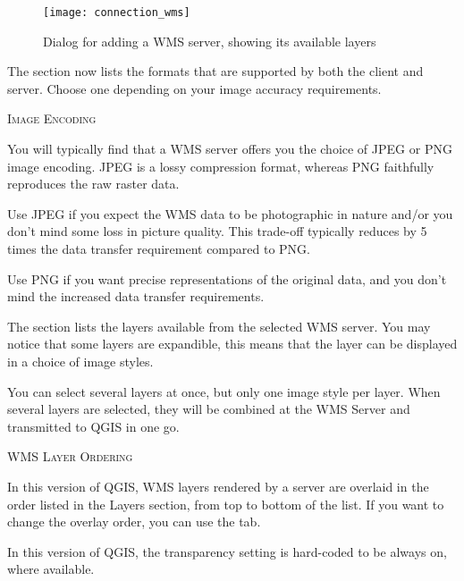 \begin{figure}[ht]
  \centering
  \texttt{[image: connection\_wms]}  
  \caption{Dialog for adding a WMS server, showing its available layers \nixcaption}\label{fig:connection_wms}
\end{figure}


The  section now lists the formats that are supported by both
the client and server.  Choose one depending on your image accuracy requirements.

\begin{Tip}[ht]\caption{\textsc{Image Encoding}}
You will typically find that a WMS server offers you the choice
of JPEG or PNG image encoding.  JPEG is a lossy compression format,
whereas PNG faithfully reproduces the raw raster data.

Use JPEG if you expect the WMS data to be photographic in nature and/or you don't
mind some loss in picture quality.  This trade-off typically reduces by 5 times
the data transfer requirement compared to PNG.

Use PNG if you want precise representations of the original data, and you don't mind
the increased data transfer requirements.
\end{Tip}

 \label{ogc-wms-layers}

The  section lists the layers available from the selected
WMS server.  You may notice that some layers are expandible, this means
that the layer can be displayed in a choice of image styles.

You can select several layers at once, but only one image style per layer.
When several layers are selected, they will be combined at the WMS Server
and transmitted to QGIS in one go.

\begin{Tip}[ht]\caption{\textsc{WMS Layer Ordering}}
In this version of QGIS, WMS layers rendered by a server are overlaid
in the order listed in the Layers section, from top to bottom of the list.
If you want to change the overlay order, you can use the  tab. 
\end{Tip}

\label{ogc-wms-transparency}

In this version of QGIS, the transparency setting is hard-coded to 
be always on, where available.

